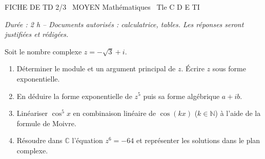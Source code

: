 \documentclass[11pt]{article}
\begin{document}
\begin{tcolorbox}[enhanced,colback=popink,colframe=popink,arc=10pt,boxrule=0pt,left=12pt,right=12pt,top=9pt,bottom=9pt]
{\color{white}\popxbold\small FICHE DE TD 2/3 \textbullet\ MOYEN \hfill Mathématiques \textbullet\ Tle C D E TI\par}
\end{tcolorbox}
\vspace{4pt}
\emph{Durée : 2 h -- Documents autorisés : calculatrice, tables. Les réponses seront justifiées et rédigées.}

\begin{exercice}
Soit le nombre complexe $z = -\sqrt{3} + i$.
\begin{enumerate}
    \item Déterminer le module et un argument principal de $z$. Écrire $z$ sous forme exponentielle.
    \item En déduire la forme exponentielle de $z^5$ puis sa forme algébrique $a + ib$.
    \item Linéariser $\cos^5 x$ en combinaison linéaire de $\cos(kx)$ ($k \in \mathbb{N}$) à l'aide de la formule de Moivre.
    \item Résoudre dans $\mathbb{C}$ l'équation $z^6 = -64$ et représenter les solutions dans le plan complexe.
\end{enumerate}
\end{exercice}
\end{document}
